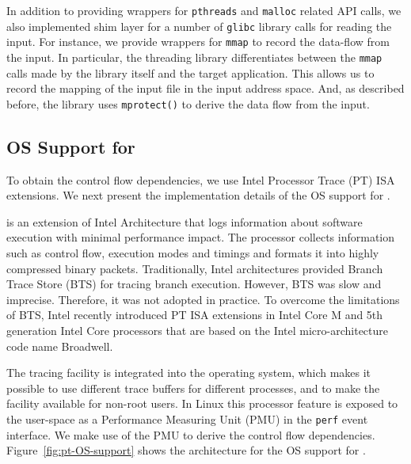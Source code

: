  In addition to providing wrappers for {\tt pthreads} and {\tt malloc} related API calls, we also implemented shim layer for a number of {\tt glibc} library calls for reading the input. For instance, we provide wrappers for {\tt mmap} to record the data-flow from the input. In particular, the threading library differentiates between the {\tt mmap} calls made by the library itself and the target application. This allows us to record the mapping of the input file in the input address space. And, as described before, the library uses {\tt mprotect()} to derive the data flow from the input. 


\subsection{OS Support for \intelpt}
\label{sec:impl-OS}
To obtain the control flow dependencies, we use Intel Processor Trace (PT) ISA extensions. We next present the implementation details of the OS support for \intelpt. 

   \intelpt is an extension of Intel Architecture that logs information about software execution with minimal performance impact. The processor collects information such as control flow, execution modes and timings and formats it into highly compressed binary packets. Traditionally, Intel architectures provided Branch Trace Store (BTS) for tracing branch execution. However, BTS was slow and imprecise. Therefore, it was not adopted in practice. To overcome the limitations of BTS,  Intel recently introduced PT ISA extensions in Intel Core M and 5th generation Intel Core processors that are based on the Intel micro-architecture code name Broadwell. 






 The \intelpt tracing facility is integrated into the operating system, which makes it possible to use  different trace buffers for different processes, and to make the facility available for non-root users.  In Linux this processor feature is exposed to the user-space as a Performance Measuring Unit (PMU) in the {\tt perf} event interface. We make use of the \intelpt PMU to derive the control flow dependencies. Figure~\ref{fig:pt-OS-support} shows the architecture for the OS support for \intelpt.

